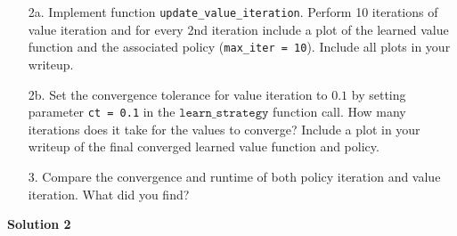 \documentclass[submit]{harvardml}
\begin{document}
\begin{framed}
\begin{itemize}
    \item [2a.] Implement function
      \texttt{update\_value\_iteration}. Perform 10 iterations of
      value iteration and for every 2nd iteration include a plot of
      the learned value function and the associated policy
      (\texttt{max\_iter = 10}).  Include all plots in your writeup. 

    \item [2b.] Set the convergence tolerance for value iteration to
      $0.1$ by setting parameter \texttt{ct = 0.1} in the
      $\texttt{learn\_strategy}$ function call.  How many iterations
      does it take for the values to converge? Include a plot in your writeup of the final converged learned value function and policy.

      
\item[3.]  Compare the convergence and runtime of both policy iteration and value iteration.  What did you find?
\end{itemize}
\end{framed}
\newpage
\textbf{Solution 2}
\end{document}
